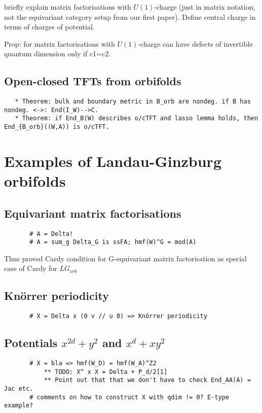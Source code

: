 \documentclass[12pt]{scrartcl}
\theoremstyle{definition}
\numberwithin{equation}{section}
\numberwithin{definition}{section}
\numberwithin{figure}{section}
\begin{document}
briefly explain matrix factorisations with $U(1)$-charge (just in matrix notation, not the equivariant category setup from our first paper). Define central charge in terms of charges of potential. 

Prop:
for matrix factorisations with $U(1)$-charge can have defects of invertible quantum dimension only if c1=c2.

\subsection{Open-closed TFTs from orbifolds}

\begin{verbatim}
   * Theorem: bulk and boundary metric in B_orb are nondeg. if B has nondeg. <->: End(I_W)-->C. 
   * Theorem: if End_B(W) describes o/cTFT and lasso lemma holds, then End_{B_orb}((W,A)) is o/cTFT.
\end{verbatim}


\section{Examples of Landau-Ginzburg orbifolds}

\subsection{Equivariant matrix factorisations}

\begin{verbatim}
       # A = Delta! 
       # A = sum_g Delta_G is ssFA; hmf(W)^G = mod(A)
\end{verbatim}

Thus proved Cardy condition for G-equivariant matrix factorisation as special case of Cardy for $LG_{orb}$

\subsection{Kn\"orrer periodicity}

\begin{verbatim}
       # X = Delta x (0 v // u 0) => Knörrer periodicity
\end{verbatim}

\subsection{Potentials $x^{2d}+y^2$ and $x^{d} + x y^2$}

\begin{verbatim}
       # X = bla => hmf(W_D) = hmf(W_A)^Z2
           ** TODO: X^ x X = Delta + P_d/2[1]
           ** Point out that that we don't have to check End_AA(A) = Jac etc.
       # comments on how to construct X with qdim != 0? E-type example? 
\end{verbatim}
\end{document}
